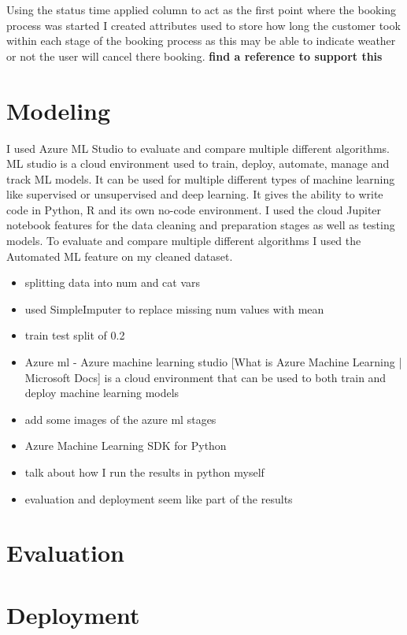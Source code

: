 Using the status time applied column to act as the first point where the booking process was started I created attributes used to store how long the customer took within each stage of the booking process as this may be able to indicate weather or not the user will cancel there booking.  \textbf{find a reference to support this}

\section{Modeling}

I used Azure ML Studio to evaluate and compare multiple different algorithms. ML studio is a cloud environment used to train, deploy, automate, manage and track ML models. It can be used for multiple different types of machine learning like supervised or unsupervised and deep learning. It gives the ability to write code in Python, R and its own no-code environment.  I used the cloud Jupiter notebook features for the data cleaning and preparation stages as well as testing models. To evaluate and compare multiple different algorithms I used the Automated ML feature on my cleaned dataset.

\begin{itemize}
\item splitting data into num and cat vars 
\item used SimpleImputer to replace missing num values with mean
\item train test split of 0.2
\item Azure ml - Azure machine learning studio [What is Azure Machine Learning | Microsoft Docs] is a cloud environment that can be used to both train and deploy machine learning models 
\item add some images of the azure ml stages
\item Azure Machine Learning SDK for Python
\item talk about how I run the results in python myself
\end{itemize}




\begin{itemize}
\item evaluation and deployment seem like part of the results
\end{itemize}

\section{Evaluation}

\section{Deployment}


